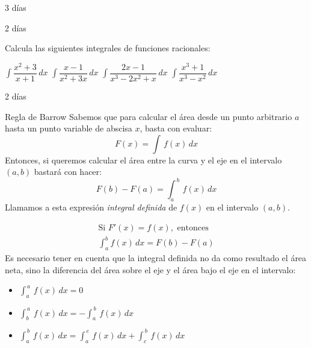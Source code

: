 \begin{definicion}{3 días}
\end{definicion}

\begin{definicion}{2 días}
\end{definicion}

\begin{ejemplo}{Calcula las siguientes integrales de funciones racionales:
\begin{apartados}
 \ap $\displaystyle{\int\dfrac{x^2+3}{x+1}\,dx}$
 \ap $\displaystyle{\int\dfrac{x-1}{x^2+3x}\,dx}$
 \ap $\displaystyle{\int\dfrac{2x-1}{x^3-2x^2+x}\,dx}$
 \ap $\displaystyle{\int\dfrac{x^3+1}{x^3-x^2}\,dx}$
\end{apartados}
}
    
\end{ejemplo}

\begin{definicion}{2 días}
\end{definicion}

\begin{definicion}{Regla de Barrow}
Sabemos que para calcular el área desde un punto arbitrario $a$ hasta un punto variable de abscisa $x$, basta con evaluar:
$$F(x)=\int\,f(x)\,dx$$
Entonces, si queremos calcular el área entre la curva y el eje en el intervalo $(a,b)$ bastará con hacer:
$$F(b)-F(a)=\int_a^{\,b}\,f(x)\,dx$$
Llamamos a esta expresión \emph{integral definida} de $f(x)$ en el intervalo $(a,b)$.

$$
\boxed{\begin{gathered}
\text{Si }F'(x)=f(x),\text{ entonces}\\
\int_a^b f(x)\,dx=F(b)-F(a)
\end{gathered}}
$$
Es necesario tener en cuenta que la integral definida no da como resultado el área neta, sino la diferencia del área sobre el eje y el área bajo el eje en el intervalo:

\begin{itemize}
    \item{}
        $\displaystyle{\int_a^{\,a}\,f(x)\,dx=0}$
    \item{}
        $\displaystyle{\int_b^{\,a}\,f(x)\,dx=-\int_a^{\,b}\,f(x)\,dx}$
    \item{} 
        $\displaystyle{\int_a^{\,b}\,f(x)\,dx=\int_a^{\,c}\,f(x)\,dx+\int_c^{\,b}\,f(x)\,dx}$
\end{itemize}
\end{definicion}

